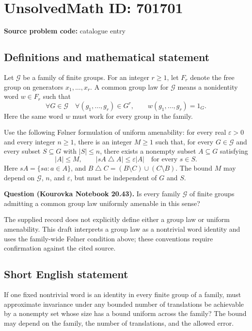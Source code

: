 \documentclass[11pt]{article}
\begin{document}
\section*{UnsolvedMath ID: 701701}
\textbf{Source problem code:} catalogue entry
\subsection{Definitions and mathematical statement}
Let \(\mathcal G\) be a family of finite groups. For an integer \(r\geq 1\), let \(F_r\) denote the free group on generators \(x_1,\ldots,x_r\). A common group law for \(\mathcal G\) means a nonidentity word \(w\in F_r\) such that
\[
\forall G\in\mathcal G\quad\forall(g_1,\ldots,g_r)\in G^r,\qquad w(g_1,\ldots,g_r)=1_G.
\]
Here the same word \(w\) must work for every group in the family.

Use the following Følner formulation of uniform amenability: for every real \(\varepsilon>0\) and every integer \(n\geq1\), there is an integer \(M\geq1\) such that, for every \(G\in\mathcal G\) and every subset \(S\subseteq G\) with \(|S|\leq n\), there exists a nonempty subset \(A\subseteq G\) satisfying
\[
|A|\leq M,
\qquad
|sA\mathbin{\triangle}A|\leq\varepsilon|A|
\quad\text{for every }s\in S.
\]
Here \(sA=\{sa:a\in A\}\), and \(B\mathbin{\triangle}C=(B\setminus C)\cup(C\setminus B)\). The bound \(M\) may depend on \(\mathcal G\), \(n\), and \(\varepsilon\), but must be independent of \(G\) and \(S\).

\textbf{Question (Kourovka Notebook 20.43).} Is every family \(\mathcal G\) of finite groups admitting a common group law uniformly amenable in this sense?

The supplied record does not explicitly define either a group law or uniform amenability. This draft interprets a group law as a nontrivial word identity and uses the family-wide Følner condition above; these conventions require confirmation against the cited source.
\subsection{Short English statement}
If one fixed nontrivial word is an identity in every finite group of a family, must approximate invariance under any bounded number of translations be achievable by a nonempty set whose size has a bound uniform across the family? The bound may depend on the family, the number of translations, and the allowed error.
\end{document}
